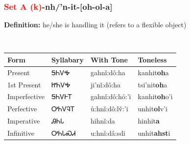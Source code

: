 \subsubsection*{\textcolor{Red}{Set A (k)}{-}\textbf{nh/'n}{-}it{-}[oh-ol-a]}
\nopagebreak
\textbf{Definition: } he/she is handling it (refers to a flexible object)
\\[0.5em]
\begin{tabularx}{\textwidth}{l X X X}%
\toprule%
\textbf{Form}&\textbf{Syllabary}&\textbf{With Tone}&\textbf{Toneless}\\%
\midrule%
Present&ᎦᏂᏙᎭ&gahnǐ:dô:ha&kanhit\textbf{oh}a\\%
1st Present&ᏥᏂᏙᎭ&ji’nǐ:dô:ha&tsi'nit\textbf{oh}a\\%
Imperfective&ᎦᏂᏙᎰᎢ&gahnǐ:dô:hó:’i&kanhit\textbf{oh}o'i\\%
Perfective&ᎤᏂᏙᎸᎢ&ù:hnǐ:dô:lv̌:’i&unhit\textbf{ol}v'i\\%
Imperative&ᎯᏂᏓ&hihnǐ:da&hinhit\textbf{a}\\%
Infinitive&ᎤᏂᏓᏍᏗ&u:hnǐ:dâ:sdi&unhit\textbf{ahst}i\\%
\bottomrule%
\end{tabularx}
\\[1em]